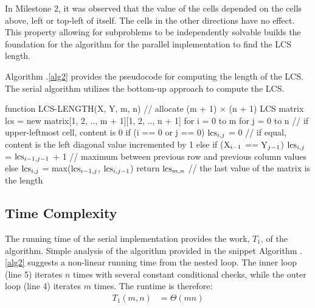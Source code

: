 \documentclass[usletter, 11pt]{extarticle}
\newcommand{\V}[1]{\textup{#1}}
\newcommand{\lcs}{\V{lcs}}
\newcommand{\seqone}{\V{X}}
\newcommand{\seqtwo}{\V{Y}}
\begin{document}
    \vspace{-1in}
    In Milestone 2, it was observed that the value of the cells depended on the
    cells above, left or top-left of itself. The cells in the other directions
    have no effect. This property allowing for subproblems to be independently
    solvable builds the foundation for the algorithm for the parallel
    implementation to find the LCS length.

    Algorithm \thesection .\ref{alg2} provides the pseudocode for
    computing the length of the LCS. The serial algorithm utilizes the bottom-up approach to compute the LCS.

\newpage
\begin{pseudocode}[caption={Serial Longest Common Subsequence Length},
label={alg2}]
function LCS-LENGTH(X, Y, m, n)
    // allocate (m + 1) $\times$ (n + 1) LCS matrix
    lcs = new matrix[1, 2, .., m + 1][1, 2, .., n + 1]
    for i = 0 to m
        for j = 0 to n
            // if upper-leftmost cell, content is 0
            if (i == 0 or j == 0)
                $\lcs_{i, j}$ = 0
            // if equal, content is the left diagonal value incremented by 1
            else if ($\seqone_{i - 1}$ == $\seqtwo_{j - 1}$)
                $\lcs_{i, j}$ = $\lcs_{i-1, j-1}$ + 1  
            // maximum between previous row and previous column values
            else
                $\lcs_{i, j}$ = max($\lcs_{i-1, j}$, $\lcs_{i, j-1}$)
    return $\lcs_{m,n}$  // the last value of the matrix is the length

\end{pseudocode}

        \subsection{Time Complexity} The running time of the serial
        implementation provides the work, $T_{1}$, of the algorithm. Simple
        analysis of the algorithm provided in the snippet Algorithm \thesection
        .\ref{alg2} suggests a non-linear running time from the nested loop.
        The inner loop (line 5) iterates $n$ times with several constant
        conditional checks, while the outer loop (line 4) iterates $m$ times.
        The runtime is therefore:
        \begin{equation*}
            \begin{split}
                T_1(m, n) & = \Theta(mn) \\
            \end{split}
        \end{equation*}
\end{document}
